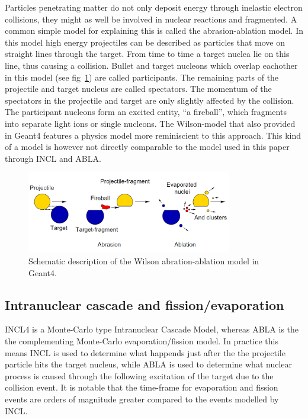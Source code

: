 Particles penetrating matter do not only deposit energy through inelastic electron collisions, they might as well be involved in nuclear reactions and fragmented. A common simple model for explaining this is called the abrasion-ablation model. In this model high energy projectiles can be described as particles that move on straight lines through the
target. From time to time a target nuclea lie on this line, thus causing a collision. Bullet
and target nucleons which overlap eachother in this model (see fig~\ref{fig:ablationabration}) are called participants. The remaining parts of the projectile and target nucleus are called spectators. The momentum of the spectators in the projectile and target are only slightly affected by the collision. The participant nucleons form an excited entity, ``a fireball'', which fragments into separate light ions or single nucleons.
The Wilson-model %
that also provided in Geant4 features a physics model more reminiscient to this approach. This kind of a model is however not directly comparable to the model used in this paper through INCL and ABLA.
\begin{figure}[h]
\begin{center}
\includegraphics[width=0.8\textwidth]{images/ablationabration.png}  
\caption{Schematic description of the Wilson abration-ablation model in Geant4.}
 \label{fig:ablationabration}
 \end{center}
 \end{figure}



\subsection{Intranuclear cascade and fission/evaporation} %

INCL4 is a Monte-Carlo type Intranuclear Cascade Model, whereas ABLA is the the complementing Monte-Carlo evaporation/fission model. In practice this means INCL is used to determine what happends just after the the projectile particle hits the target nucleus, while ABLA is used to determine what nuclear process is caused through the following excitation of the target due to the collision event. It is notable that the time-frame for evaporation and fission events are orders of magnitude greater compared to the events modelled by INCL.

